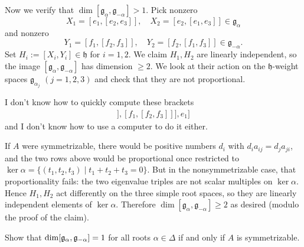 \documentclass[12pt]{article}
\begin{document}
\begin{solution}[Incomplete]
Now we verify that $\dim [\mathfrak{g}_\alpha,\mathfrak{g}_{-\alpha}]>1$. Pick nonzero
\[
X_1=[e_1,[e_2,e_3]], \quad X_2=[e_2,[e_1,e_3]]\in \mathfrak{g}_\alpha
\]
and nonzero 
\[
Y_1=[f_1,[f_2,f_3]], \quad Y_2=[f_2,[f_1,f_3]]\in \mathfrak{g}_{-\alpha}.
\]
Set
$H_i:=[X_i,Y_i]\in\mathfrak{h}$ for $i=1,2$. We claim $H_1,H_2$ are linearly independent, so the image $[\mathfrak{g}_\alpha,\mathfrak{g}_{-\alpha}]$ has dimension $\geq2$. We look at their action on the $\mathfrak{h}$-weight spaces $\mathfrak{g}_{\alpha_j}$ $(j=1,2,3)$ and check that they are not proportional.

I don't know how to quickly compute these brackets \begin{align*}
    [[[e_1,[e_2,e_3]],[f_1,[f_2,f_3]]],e_1]
\end{align*} and I don't know how to use a computer to do it either. 

If $A$ were symmetrizable, there would be positive numbers $d_i$ with $d_i a_{ij}=d_j a_{ji}$, and the two rows above would be proportional once restricted to $\ker\alpha=\{(t_1,t_2,t_3)\mid t_1+t_2+t_3=0\}$. But in the nonsymmetrizable case, that proportionality fails: the two eigenvalue triples are not scalar multiples on $\ker\alpha$. Hence $H_1,H_2$ act differently on the three simple root spaces, so they are linearly independent elements of $\ker\alpha$. Therefore $\dim [\mathfrak{g}_\alpha,\mathfrak{g}_{-\alpha}] \geq 2$ as desired (modulo the proof of the claim).
\end{solution}

\begin{exercise}
    Show that $\dim [\mathfrak{g}_\alpha,\mathfrak{g}_{-\alpha}] = 1$ for all roots $\alpha \in \Delta$ if and only if $A$ is symmetrizable.
\end{exercise}
\end{document}
